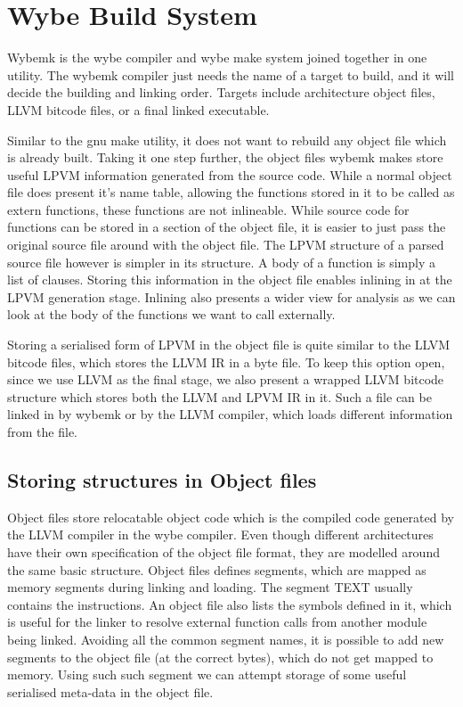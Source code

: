 \chapter{Wybe Build System}

Wybemk is the wybe compiler and wybe make system joined together in one
utility. The wybemk compiler just needs the name of a target to build, and it
will decide the building and linking order. Targets include architecture object
files, LLVM bitcode files, or a final linked executable. 

Similar to the gnu make utility, it does not want to rebuild any object file
which is already built. Taking it one step further, the object files wybemk
makes store useful LPVM information generated from the source code. While a
normal object file does present it's name table, allowing the functions stored
in it to be called as extern functions, these functions are not
inlineable. While source code for functions can be stored in a section of the
object file, it is easier to just pass the original source file around with the
object file. The LPVM structure of a parsed source file however is simpler in
its structure. A body of a function is simply a list of clauses. Storing this
information in the object file enables inlining in at the LPVM generation
stage. Inlining also presents a wider view for analysis as we can look at the
body of the functions we want to call externally. 

Storing a serialised form of LPVM in the object file is quite similar to the
LLVM bitcode files, which stores the LLVM IR in a byte file. To keep this
option open, since we use LLVM as the final stage, we also present a wrapped
LLVM bitcode structure which stores both the LLVM and LPVM IR in it. Such a
file can be linked in by wybemk or by the LLVM compiler, which loads different
information from the file.


\section{Storing structures in Object files}

Object files store relocatable object code which is the compiled code generated
by the LLVM compiler in the wybe compiler. Even though different architectures
have their own specification of the object file format, they are modelled
around the same basic structure. Object files defines segments, which are
mapped as memory segments during linking and loading. The segment TEXT usually
contains the instructions. An object file also lists the symbols defined in it,
which is useful for the linker to resolve external function calls from another
module being linked. Avoiding all the common segment names, it is possible to
add new segments to the object file (at the correct bytes), which do not get
mapped to memory. Using such such segment we can attempt storage of some useful
serialised meta-data in the object file.

